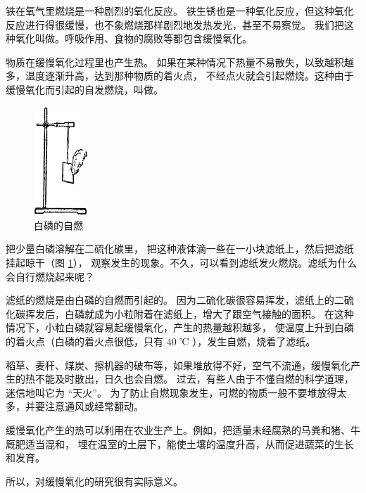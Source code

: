 铁在氧气里燃烧是一种剧烈的氧化反应。
铁生锈也是一种氧化反应，但这种氧化反应进行得很缓慢，也不象燃烧那样剧烈地发热发光，甚至不易察觉。
我们把这种氧化叫做。呼吸作用、食物的腐败等都包含缓慢氧化。

物质在缓慢氧化过程里也产生热。
如果在某种情况下热量不易散失，以致越积越多，温度逐渐升高，达到那种物质的着火点，
不经点火就会引起燃烧。这种由于缓慢氧化而引起的自发燃烧，叫做。


\begin{figure}
    \centering
    \includegraphics[width=2cm]{../pic/czhx1-ch1-7}
    \caption{白磷的自燃}\label{fig:1-7}
\end{figure}

\wrapfiguretrick

\begin{shiyan}
    把少量白磷溶解在二硫化碳里， 把这种液体滴一些在一小块滤纸上，然后把滤纸挂起晾干（图 \ref{fig:1-7}），
    观察发生的现象。不久，可以看到滤纸发火燃烧。滤纸为什么会自行燃烧起来呢？
\end{shiyan}

滤纸的燃烧是由白磷的自燃而引起的。
因为二硫化碳很容易挥发，滤纸上的二硫化碳挥发后，白磷就成为小粒附着在滤纸上，增大了跟空气接触的面积。
在这种情况下，小粒白磷就容易起缓慢氧化，产生的热量越积越多，
使温度上升到白磷的着火点（白磷的着火点很低，只有 $40$ ℃ ），发生自燃，烧着了滤纸。

\begin{yuedu}

    稻草、麦秆、煤炭、擦机器的破布等，如果堆放得不好，空气不流通，缓慢氧化产生的热不能及时散出，日久也会自燃。
    过去，有些人由于不懂自燃的科学道理，迷信地叫它为 “天火”。
    为了防止自燃现象发生，可燃的物质一般不要堆放得太多，并要注意通风或经常翻动。

    缓慢氧化产生的热可以利用在农业生产上。例如，把适量未经腐熟的马粪和猪、牛厩肥适当混和，
    埋在温室的土层下，能使土壤的温度升高，从而促进蔬菜的生长和发育。

    所以，对缓慢氧化的研究很有实际意义。

\end{yuedu}


